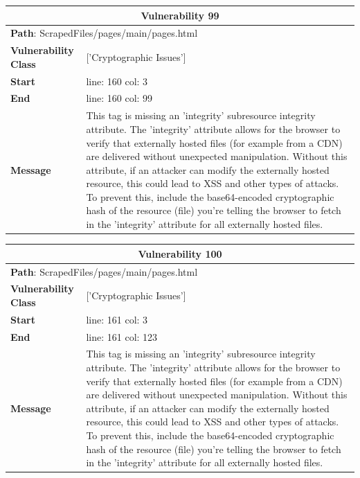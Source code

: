 \documentclass[12pt]{article}
\begin{document}
\vspace{0.7cm}
\FloatBarrier
\begin{table}[!h]
\centering
\renewcommand{\arraystretch}{1.3}
\begin{tabular}{|l|p{10cm}|}
\hline
\multicolumn{2}{|c|}{\textbf{Vulnerability 99}} \\
\hline
\multicolumn{2}{|l|}{\textbf{Path}: ScrapedFiles/pages/main/pages.html} \\
\hline
\textbf{Vulnerability Class} & ['Cryptographic Issues'] \\
\hline
\textbf{Start} & line: 160 \quad col: 3 \\
\hline
\textbf{End} & line: 160 \quad col: 99 \\
\hline
\textbf{Message} & This tag is missing an 'integrity' subresource integrity attribute. The 'integrity' attribute allows for the browser to verify that externally hosted files (for example from a CDN) are delivered without unexpected manipulation. Without this attribute, if an attacker can modify the externally hosted resource, this could lead to XSS and other types of attacks. To prevent this, include the base64-encoded cryptographic hash of the resource (file) you're telling the browser to fetch in the 'integrity' attribute for all externally hosted files. \\
\hline
\end{tabular}
\end{table}
\vspace{0.7cm}
\FloatBarrier
\begin{table}[!h]
\centering
\renewcommand{\arraystretch}{1.3}
\begin{tabular}{|l|p{10cm}|}
\hline
\multicolumn{2}{|c|}{\textbf{Vulnerability 100}} \\
\hline
\multicolumn{2}{|l|}{\textbf{Path}: ScrapedFiles/pages/main/pages.html} \\
\hline
\textbf{Vulnerability Class} & ['Cryptographic Issues'] \\
\hline
\textbf{Start} & line: 161 \quad col: 3 \\
\hline
\textbf{End} & line: 161 \quad col: 123 \\
\hline
\textbf{Message} & This tag is missing an 'integrity' subresource integrity attribute. The 'integrity' attribute allows for the browser to verify that externally hosted files (for example from a CDN) are delivered without unexpected manipulation. Without this attribute, if an attacker can modify the externally hosted resource, this could lead to XSS and other types of attacks. To prevent this, include the base64-encoded cryptographic hash of the resource (file) you're telling the browser to fetch in the 'integrity' attribute for all externally hosted files. \\
\hline
\end{tabular}
\end{table}
\end{document}
